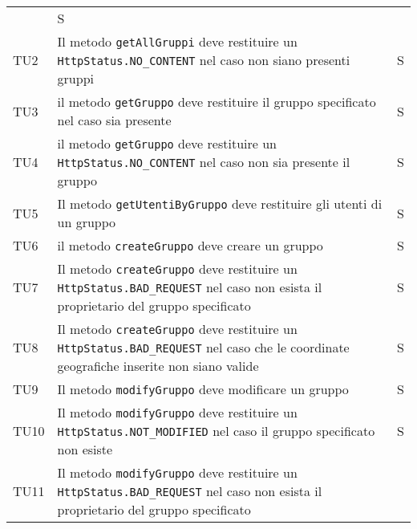 \begin{center}
{\begin{longtable}{
      |>{\centering\arraybackslash}p{48pt}
      |>{\centering\arraybackslash}p{308pt}
      |>{\centering\arraybackslash}p{27pt}|}
                  & S                                              \\
      TU2
                  & Il metodo \texttt{getAllGruppi}
      deve restituire un \texttt{HttpStatus.NO\_CONTENT} nel caso non siano
      presenti
      gruppi
                  & S                                              \\
      TU3
                  & il metodo \texttt{getGruppo} deve
      restituire il gruppo specificato nel caso sia presente
                  & S                                              \\
      TU4
                  & il metodo \texttt{getGruppo} deve
      restituire un \texttt{HttpStatus.NO\_CONTENT} nel caso non sia presente
      il
      gruppo
                  & S                                              \\
      TU5
                  & Il metodo
      \texttt{getUtentiByGruppo} deve restituire gli utenti di un gruppo
                  & S                                              \\
      TU6
                  & il metodo \texttt{createGruppo}
      deve creare un gruppo
                  & S                                              \\
      TU7
                  & Il metodo \texttt{createGruppo}
      deve restituire un \texttt{ HttpStatus.BAD\_REQUEST} nel caso non esista
      il
      proprietario del gruppo specificato
                  & S                                              \\
      TU8
                  & Il metodo \texttt{createGruppo}
      deve restituire un \texttt{ HttpStatus.BAD\_REQUEST} nel caso che le
      coordinate
      geografiche inserite non siano valide
                  & S                                              \\
      TU9
                  & Il metodo \texttt{modifyGruppo}
      deve modificare un gruppo
                  & S                                              \\
      TU10
                  & Il metodo \texttt{modifyGruppo}
      deve restituire un \texttt{ HttpStatus.NOT\_MODIFIED} nel caso il gruppo
      specificato non esiste
                  & S                                              \\
      TU11
                  & Il metodo \texttt{modifyGruppo}
      deve restituire un \texttt{ HttpStatus.BAD\_REQUEST} nel caso non esista
      il
      proprietario del gruppo specificato

\end{longtable}}
\end{center}
